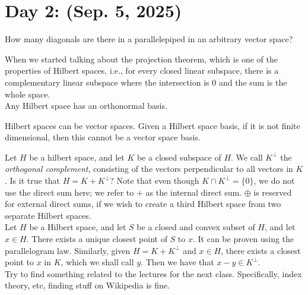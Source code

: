 \section{Day 2: (Sep. 5, 2025)}
\begin{exercise}
    How many diagonals are there in a parallelepiped in an arbitrary vector space?
\end{exercise}
\noindent When we started talking about the projection theorem, which is one of the properties of Hilbert spaces, i.e., for every closed linear subspace, there is a complementary linear subspace where the intersection is $0$ and the sum is the whole space.
\\[8pt]
Any Hilbert space has an orthonormal basis.
\begin{exercise}
    Hilbert spaces can be vector spaces. Given a Hilbert space basis, if it is not finite dimensional, then this cannot be a vector space basis.
\end{exercise}
\noindent Let $H$ be a hilbert space, and let $K$ be a closed subspace of $H$. We call $K^\perp$ the \textit{orthogonal complement}, consisting of the vectors perpendicular to all vectors in $K$. Is it true that $H = K + K^\perp$? Note that even though $K \cap K^\perp = \{0\}$, we do not use the direct sum here; we refer to $+$ as the internal direct sum. $\oplus$ is reserved for external direct sums, if we wish to create a third Hilbert space from two separate Hilbert spaces.
\\[8pt]
Let $H$ be a Hilbert space, and let $S$ be a closed and convex subset of $H$, and let $x \in H$. There exists a unique closest point of $S$ to $x$. It can be proven using the parallelogram law. Similarly, given $H = K + K^\perp$ and $x \in H$, there exists a closest point to $x$ in $K$, which we shall call $y$. Then we have that $x - y \in K^\perp$.
\\[8pt]
Try to find something related to the lectures for the next class. Specifically, index theory, etc, finding stuff on Wikipedia is fine.